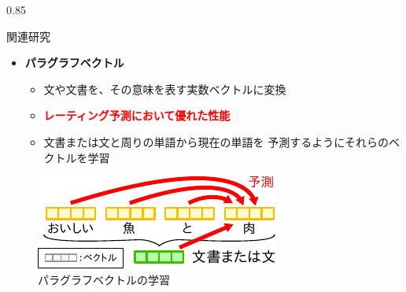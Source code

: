 \documentclass[unicode,10pt]{beamer}
\newlength{\mycolumnwidth}
\newcommand{\itemtitle}[1]{\textbf{#1}\\}
\newcommand{\fire}[1]{\textcolor{red}{\textbf{#1}}}
\newcommand{\doublecolumns}[4]{
    \begin{minipage}[t]{#1}
      #2
    \end{minipage}
    \begin{minipage}[t]{#3}
      #4
    \end{minipage}}
\begin{document}
\begin{frame}[t]
\begin{columns}[onlytextwidth,t]
\begin{column}{0.85\mycolumnwidth}
\begin{block}{関連研究}
    \begin{itemize}
      \item \itemtitle{パラグラフベクトル\cite{quoc14}}
        \begin{itemize}
          \item 文や文書を、その意味を表す実数ベクトルに変換
          \item \fire{レーティング予測において優れた性能}
          \item 文書または文と周りの単語から現在の単語を
                予測するようにそれらのベクトルを学習
        \end{itemize}
    \end{itemize}

    \begin{figure}
      \includegraphics[width=0.7\linewidth]{fig/paragraph_vector_v2.pdf}
      \caption*{パラグラフベクトルの学習}
    \end{figure}
  \end{block}
\end{column}


\end{columns}
\end{frame}
\end{document}

